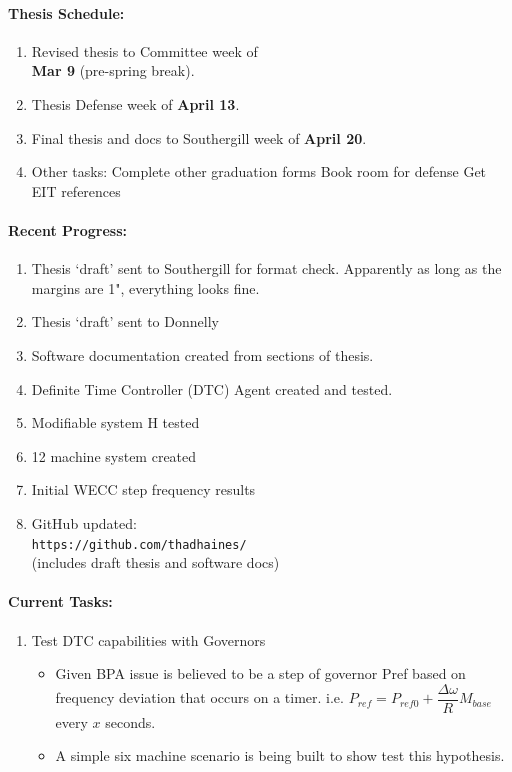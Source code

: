 \documentclass[12pt]{article}
\begin{document}
\begin{multicols}{2}
\raggedright
	\paragraph{Thesis Schedule:}
	\begin{enumerate}
\itemsep0em 
		\item Revised thesis to Committee week of \\ \textbf{Mar 9} (pre-spring break).
		\item Thesis Defense week of \textbf{April 13}.
		\item Final thesis and docs to Southergill week of \textbf{April 20}.
\item Other tasks:
\subitem Complete other graduation forms
\subitem Book room for defense
\subitem Get EIT references
\end{enumerate}

	\paragraph{Recent Progress:}
	\begin{enumerate}
\itemsep0em 
\item Thesis `draft' sent to Southergill for format check. Apparently as long as the margins are 1", everything looks fine.
\item Thesis `draft' sent to Donnelly
\item Software documentation created from sections of thesis.
\item Definite Time Controller (DTC) Agent created and tested.
\item Modifiable system H tested
\item 12 machine system created
\item Initial WECC step frequency results

		\item GitHub updated:\\
		\verb|https://github.com/thadhaines/ |\\
(includes draft thesis and software docs)

\vfill\null
\columnbreak
	
	\end{enumerate}
\paragraph{Current Tasks:}
	\begin{enumerate}
		\itemsep0em 
		\item Test DTC capabilities with Governors
\begin{itemize}
			\item Given BPA issue is believed to be a step of governor Pref based on frequency deviation that occurs on a timer. i.e. $P_{ref} = P_{ref0} + \dfrac{\Delta \omega}{R}M_{base} $ every $x$ seconds.
			\item A simple six machine scenario is being built to show test this hypothesis.  
\end{itemize}


\end{enumerate}
\end{multicols}
\end{document}
